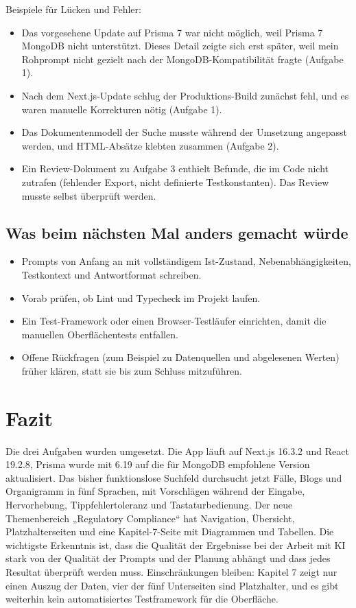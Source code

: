 \documentclass[11pt,a4paper]{article}
\let\oldsubsection\subsection
\renewcommand{\subsection}{\needspace{6\baselineskip}\oldsubsection}
\begin{document}
Beispiele für Lücken und Fehler:
\begin{itemize}[nosep]
  \item Das vorgesehene Update auf Prisma 7 war nicht möglich, weil Prisma 7 MongoDB nicht unterstützt. Dieses Detail zeigte sich erst später, weil mein Rohprompt nicht gezielt nach der MongoDB-Kompatibilität fragte (Aufgabe 1).
  \item Nach dem Next.js-Update schlug der Produktions-Build zunächst fehl, und es waren manuelle Korrekturen nötig (Aufgabe 1).
  \item Das Dokumentenmodell der Suche musste während der Umsetzung angepasst werden, und HTML-Absätze klebten zusammen (Aufgabe 2).
  \item Ein Review-Dokument zu Aufgabe 3 enthielt Befunde, die im Code nicht zutrafen (fehlender Export, nicht definierte Testkonstanten). Das Review musste selbst überprüft werden.
\end{itemize}

\subsection{Was beim nächsten Mal anders gemacht würde}
\begin{itemize}[nosep]
  \item Prompts von Anfang an mit vollständigem Ist-Zustand, Nebenabhängigkeiten, Testkontext und Antwortformat schreiben.
  \item Vorab prüfen, ob Lint und Typecheck im Projekt laufen.
  \item Ein Test-Framework oder einen Browser-Testläufer einrichten, damit die manuellen Oberflächentests entfallen.
  \item Offene Rückfragen (zum Beispiel zu Datenquellen und abgelesenen Werten) früher klären, statt sie bis zum Schluss mitzuführen.
\end{itemize}

\section{Fazit}
Die drei Aufgaben wurden umgesetzt. Die App läuft auf Next.js 16.3.2 und React 19.2.8, Prisma wurde mit 6.19 auf die für MongoDB empfohlene Version aktualisiert. Das bisher funktionslose Suchfeld durchsucht jetzt Fälle, Blogs und Organigramm in fünf Sprachen, mit Vorschlägen während der Eingabe, Hervorhebung, Tippfehlertoleranz und Tastaturbedienung. Der neue Themenbereich „Regulatory Compliance“ hat Navigation, Übersicht, Platzhalterseiten und eine Kapitel-7-Seite mit Diagrammen und Tabellen. Die wichtigste Erkenntnis ist, dass die Qualität der Ergebnisse bei der Arbeit mit KI stark von der Qualität der Prompts und der Planung abhängt und dass jedes Resultat überprüft werden muss. Einschränkungen bleiben: Kapitel 7 zeigt nur einen Auszug der Daten, vier der fünf Unterseiten sind Platzhalter, und es gibt weiterhin kein automatisiertes Testframework für die Oberfläche.
\end{document}
